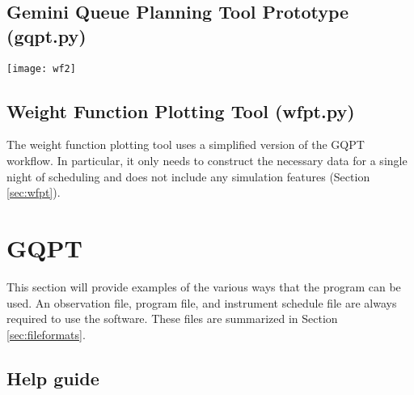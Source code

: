\documentclass{article}
\begin{document}
\subsection{Gemini Queue Planning Tool Prototype (gqpt.py)}
{\centering
 \texttt{[image: wf2]}\\
 \label{fig:pythonworkflow}
}
\vspace{4mm}

\subsection{Weight Function Plotting Tool (wfpt.py)}
The weight function plotting tool uses a simplified version of the GQPT workflow.  In particular, it only needs to construct the necessary data for a single night of scheduling and does not include any simulation features (Section \ref{sec:wfpt}).

\section{GQPT}
\label{sec:gqpt}
This section will provide examples of the various ways that the program can be used.  An observation file, program file, and instrument schedule file are always required to use the software.  These files are summarized in Section \ref{sec:fileformats}.  

\subsection{Help guide}
\end{document}
